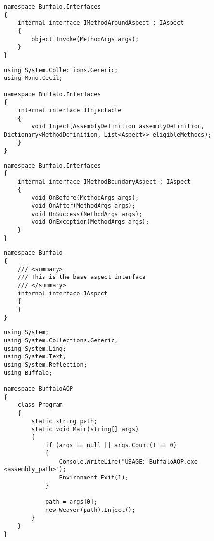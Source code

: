 \begin{lstlisting}[caption={../buffalo/Interfaces/IMethodAroundAspect.cs}, label=../buffalo/Interfaces/IMethodAroundAspect.cs, frame=tb, basicstyle=\scriptsize]﻿namespace Buffalo.Interfaces
{
    internal interface IMethodAroundAspect : IAspect
    {
        object Invoke(MethodArgs args);
    }
}
\end{lstlisting}

\begin{lstlisting}[caption={../buffalo/Interfaces/IInjectable.cs}, label=../buffalo/Interfaces/IInjectable.cs, frame=tb, basicstyle=\scriptsize]﻿using System.Collections.Generic;
using Mono.Cecil;

namespace Buffalo.Interfaces
{
    internal interface IInjectable
    {
        void Inject(AssemblyDefinition assemblyDefinition, Dictionary<MethodDefinition, List<Aspect>> eligibleMethods);
    }
}
\end{lstlisting}

\begin{lstlisting}[caption={../buffalo/Interfaces/IMethodBoundaryAspect.cs}, label=../buffalo/Interfaces/IMethodBoundaryAspect.cs, frame=tb, basicstyle=\scriptsize]﻿namespace Buffalo.Interfaces
{
    internal interface IMethodBoundaryAspect : IAspect
    {
        void OnBefore(MethodArgs args);
        void OnAfter(MethodArgs args);
        void OnSuccess(MethodArgs args);
        void OnException(MethodArgs args);
    }
}
\end{lstlisting}

\begin{lstlisting}[caption={../buffalo/Interfaces/IAspect.cs}, label=../buffalo/Interfaces/IAspect.cs, frame=tb, basicstyle=\scriptsize]﻿namespace Buffalo
{
    /// <summary>
    /// This is the base aspect interface
    /// </summary>
    internal interface IAspect
    {
    }
}
\end{lstlisting}

\begin{lstlisting}[caption={../../buffalo/BuffaloAOP/Program.cs}, label=../../buffalo/BuffaloAOP/Program.cs, frame=tb, basicstyle=\scriptsize]﻿using System;
using System.Collections.Generic;
using System.Linq;
using System.Text;
using System.Reflection;
using Buffalo;

namespace BuffaloAOP
{
    class Program
    {
        static string path;
        static void Main(string[] args)
        {
            if (args == null || args.Count() == 0)
            {
                Console.WriteLine("USAGE: BuffaloAOP.exe <assembly_path>");
                Environment.Exit(1);
            }

            path = args[0];
            new Weaver(path).Inject();
        }
    }
}
\end{lstlisting}

